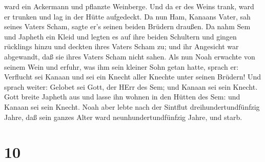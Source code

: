 ward ein Ackermann und pflanzte Weinberge.  Und da er des
Weins trank, ward er trunken und lag in der Hütte aufgedeckt.
 Da nun Ham, Kanaans Vater, sah seines Vaters Scham, sagte
er's seinen beiden Brüdern draußen.  Da nahm Sem und
Japheth ein Kleid und legten es auf ihre beiden Schultern und gingen
rücklings hinzu und deckten ihres Vaters Scham zu; und ihr Angesicht war
abgewandt, daß sie ihres Vaters Scham nicht sahen.  Als nun
Noah erwachte von seinem Wein und erfuhr, was ihm sein kleiner Sohn
getan hatte,  sprach er: Verflucht sei Kanaan und sei ein
Knecht aller Knechte unter seinen Brüdern!  Und sprach
weiter: Gelobet sei Gott, der HErr des Sem; und Kanaan sei sein Knecht.
 Gott breite Japheth aus und lasse ihn wohnen in den Hütten
des Sem: und Kanaan sei sein Knecht.  Noah aber lebte nach
der Sintflut dreihundertundfünfzig Jahre,  daß sein ganzes
Alter ward neunhundertundfünfzig Jahre, und starb.

\hypertarget{section-9}{%
\section{10}\label{section-9}}

